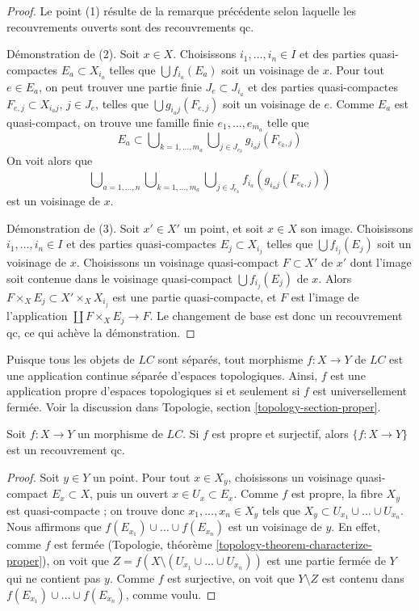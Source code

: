 \begin{proof}
Le point (1) résulte de la remarque précédente selon laquelle les
recouvrements ouverts sont des recouvrements qc.

\medskip\noindent
Démonstration de (2). Soit $x \in X$. Choisissons
$i_1, \ldots, i_n \in I$ et des parties quasi-compactes
$E_a \subset X_{i_a}$ telles que $\bigcup f_{i_a}(E_a)$ soit un voisinage
de $x$. Pour tout $e \in E_a$, on peut trouver une partie finie
$J_e \subset J_{i_a}$ et des parties quasi-compactes
$F_{e, j} \subset X_{i_a j}$, $j \in J_e$, telles que
$\bigcup g_{i_a j}(F_{e, j})$ soit un voisinage de $e$. Comme $E_a$ est
quasi-compact, on trouve une famille finie
$e_1, \ldots, e_{m_a}$ telle que
$$
E_a \subset
\bigcup\nolimits_{k = 1, \ldots, m_a}
\bigcup\nolimits_{j \in J_{e_k}} g_{i_a j}(F_{e_k, j})
$$
On voit alors que
$$
\bigcup\nolimits_{a = 1, \ldots, n}
\bigcup\nolimits_{k = 1, \ldots, m_a}
\bigcup\nolimits_{j \in J_{e_k}} f_{i_a}(g_{i_a j}(F_{e_k, j}))
$$
est un voisinage de $x$.

\medskip\noindent
Démonstration de (3). Soit $x' \in X'$ un point, et soit $x \in X$ son
image. Choisissons $i_1, \ldots, i_n \in I$ et des parties quasi-compactes
$E_j \subset X_{i_j}$ telles que $\bigcup f_{i_j}(E_j)$ soit un voisinage
de $x$. Choisissons un voisinage quasi-compact $F \subset X'$ de $x'$ dont
l'image soit contenue dans le voisinage quasi-compact
$\bigcup f_{i_j}(E_j)$ de $x$. Alors
$F \times_X E_j \subset X' \times_X X_{i_j}$ est une partie quasi-compacte,
et $F$ est l'image de l'application
$\coprod F \times_X E_j \to F$. Le changement de base est donc un
recouvrement qc, ce qui achève la démonstration.
\end{proof}

\noindent
Puisque tous les objets de $\textit{LC}$ sont séparés, tout morphisme
$f : X \to Y$ de $\textit{LC}$ est une application continue séparée
d'espaces topologiques. Ainsi, $f$ est une application propre d'espaces
topologiques si et seulement si $f$ est universellement fermée. Voir la
discussion dans Topologie, section \ref{topology-section-proper}.

\begin{lemma}
\label{lemma-proper-surjective-is-qc-covering}
Soit $f : X \to Y$ un morphisme de $\textit{LC}$. Si $f$ est propre et
surjectif, alors $\{f : X \to Y\}$ est un recouvrement qc.
\end{lemma}

\begin{proof}
Soit $y \in Y$ un point. Pour tout $x \in X_y$, choisissons un voisinage
quasi-compact $E_x \subset X$, puis un ouvert $x \in U_x \subset E_x$.
Comme $f$ est propre, la fibre $X_y$ est quasi-compacte ; on trouve donc
$x_1, \ldots, x_n \in X_y$ tels que
$X_y \subset U_{x_1} \cup \ldots \cup U_{x_n}$.
Nous affirmons que $f(E_{x_1}) \cup \ldots \cup f(E_{x_n})$ est un voisinage
de $y$. En effet, comme $f$ est fermée
(Topologie, théorème \ref{topology-theorem-characterize-proper}),
on voit que
$Z = f(X \setminus (U_{x_1} \cup \ldots \cup U_{x_n}))$
est une partie fermée de $Y$ qui ne contient pas $y$. Comme $f$ est
surjective, on voit que $Y \setminus Z$ est contenu dans
$f(E_{x_1}) \cup \ldots \cup f(E_{x_n})$, comme voulu.
\end{proof}

